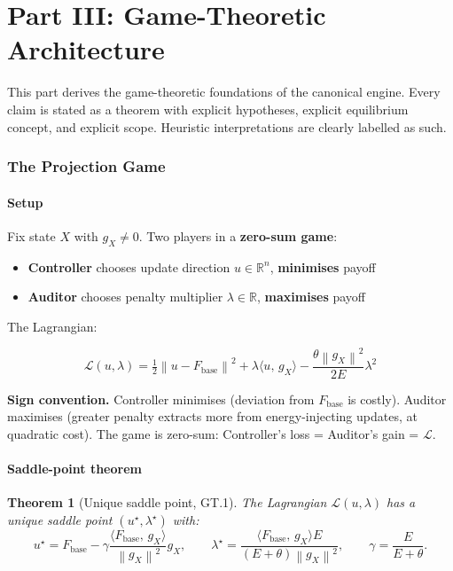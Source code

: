 \documentclass[11pt,a4paper]{article}
\newtheorem{theorem}{Theorem}[section]
\theoremstyle{definition}
\newcommand{\R}{\mathbb{R}}
\newcommand{\norm}[1]{\left\|#1\right\|}
\newcommand{\inner}[2]{\langle #1,\,#2\rangle}
\newcommand{\Fbase}{F_{\mathrm{base}}}
\newcommand{\gX}{g_X}
\newcommand{\half}{\tfrac{1}{2}}
\begin{document}
\newpage
\part*{Part III: Game-Theoretic Architecture}

This part derives the game-theoretic foundations of the canonical engine.
Every claim is stated as a theorem with explicit hypotheses, explicit equilibrium concept,
and explicit scope. Heuristic interpretations are clearly labelled as such.

\section{The Projection Game}

\subsection{Setup}

Fix state $X$ with $\gX \neq 0$. Two players in a \textbf{zero-sum game}:

\begin{itemize}
\item \textbf{Controller} chooses update direction $u \in \R^n$, \textbf{minimises} payoff
\item \textbf{Auditor} chooses penalty multiplier $\lambda \in \R$, \textbf{maximises} payoff
\end{itemize}

The Lagrangian:

\begin{lockedbox}
\[
\mathcal{L}(u,\lambda) = \half\norm{u-\Fbase}^2 + \lambda\inner{u}{\gX} - \frac{\theta\norm{\gX}^2}{2E}\lambda^2
\]
\end{lockedbox}

\textbf{Sign convention.} Controller minimises (deviation from $\Fbase$ is costly).
Auditor maximises (greater penalty extracts more from energy-injecting updates, at quadratic cost).
The game is zero-sum: Controller's loss = Auditor's gain = $\mathcal{L}$.

\subsection{Saddle-point theorem}

\begin{theorem}[Unique saddle point, GT.1]
The Lagrangian $\mathcal{L}(u,\lambda)$ has a unique saddle point $(u^\star, \lambda^\star)$ with:
\[
u^\star = \Fbase - \gamma\frac{\inner{\Fbase}{\gX}}{\norm{\gX}^2}\gX,
\qquad
\lambda^\star = \frac{\inner{\Fbase}{\gX}E}{(E+\theta)\norm{\gX}^2},
\qquad
\gamma = \frac{E}{E+\theta}.
\]
\end{theorem}
\end{document}
